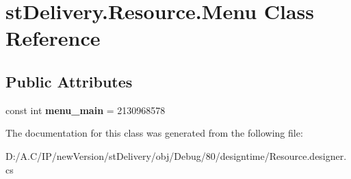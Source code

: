 \hypertarget{classst_delivery_1_1_resource_1_1_menu}{}\section{st\+Delivery.\+Resource.\+Menu Class Reference}
\label{classst_delivery_1_1_resource_1_1_menu}
\subsection*{Public Attributes}
\begin{DoxyCompactItemize}
\item 
\mbox{\label{classst_delivery_1_1_resource_1_1_menu_a1caa25a5c6676debd1110e10f9a069b1}} 
const int {\bfseries menu\+\_\+main} = 2130968578
\end{DoxyCompactItemize}


The documentation for this class was generated from the following file\+:\begin{DoxyCompactItemize}
\item 
D\+:/\+A.\+C/\+I\+P/new\+Version/st\+Delivery/obj/\+Debug/80/designtime/Resource.\+designer.\+cs\end{DoxyCompactItemize}

